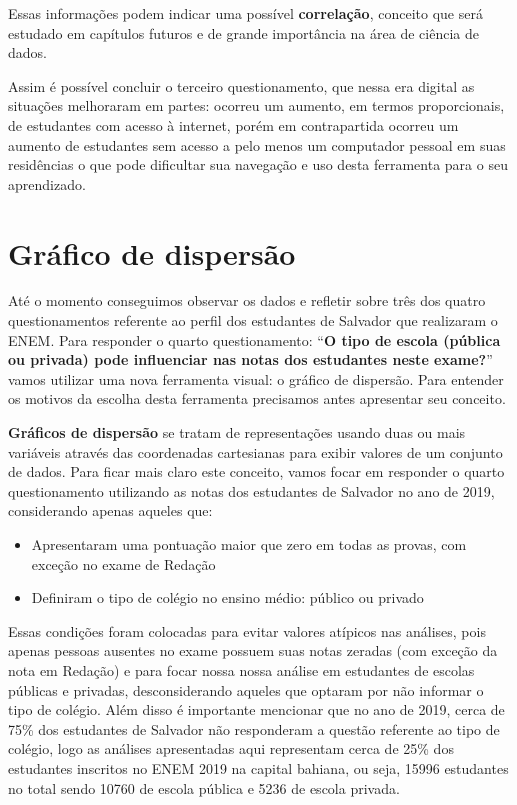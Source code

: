 \documentclass[
  portuguese,
  oneside]{book}
\begin{document}
Essas informações podem indicar uma possível \textbf{correlação}, conceito que será estudado em capítulos futuros e de grande importância na área de ciência de dados.

Assim é possível concluir o terceiro questionamento, que nessa era digital as situações melhoraram em partes: ocorreu um aumento, em termos proporcionais, de estudantes com acesso à internet, porém em contrapartida ocorreu um aumento de estudantes sem acesso a pelo menos um computador pessoal em suas residências o que pode dificultar sua navegação e uso desta ferramenta para o seu aprendizado.

\hypertarget{gdisp}{%
\section{Gráfico de dispersão}\label{gdisp}}

Até o momento conseguimos observar os dados e refletir sobre três dos quatro questionamentos referente ao perfil dos estudantes de Salvador que realizaram o ENEM. Para responder o quarto questionamento: ``\textbf{O tipo de escola (pública ou privada) pode influenciar nas notas dos estudantes neste exame?}'' vamos utilizar uma nova ferramenta visual: o gráfico de dispersão. Para entender os motivos da escolha desta ferramenta precisamos antes apresentar seu conceito.

\textbf{Gráficos de dispersão} se tratam de representações usando duas ou mais variáveis através das coordenadas cartesianas para exibir valores de um conjunto de dados. Para ficar mais claro este conceito, vamos focar em responder o quarto questionamento utilizando as notas dos estudantes de Salvador no ano de 2019, considerando apenas aqueles que:

\begin{itemize}
\item
  Apresentaram uma pontuação maior que zero em todas as provas, com exceção no exame de Redação
\item
  Definiram o tipo de colégio no ensino médio: público ou privado
\end{itemize}

Essas condições foram colocadas para evitar valores atípicos nas análises, pois apenas pessoas ausentes no exame possuem suas notas zeradas (com exceção da nota em Redação) e para focar nossa nossa análise em estudantes de escolas públicas e privadas, desconsiderando aqueles que optaram por não informar o tipo de colégio. Além disso é importante mencionar que no ano de 2019, cerca de 75\% dos estudantes de Salvador não responderam a questão referente ao tipo de colégio, logo as análises apresentadas aqui representam cerca de 25\% dos estudantes inscritos no ENEM 2019 na capital bahiana, ou seja, 15996 estudantes no total sendo 10760 de escola pública e 5236 de escola privada.
\end{document}
